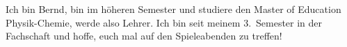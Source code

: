 \begin{multicols*}{2}
{Ich bin Bernd, bin im höheren Semester und studiere den Master of Education Physik-Chemie, werde also Lehrer. Ich bin seit meinem 3.\ Semester in der Fachschaft und hoffe, euch mal auf den Spieleabenden zu treffen!
\vspace{2\baselineskip}
}
\fibelvorstellung{
	\begin{figure}

\end{figure}}
\end{multicols*}
